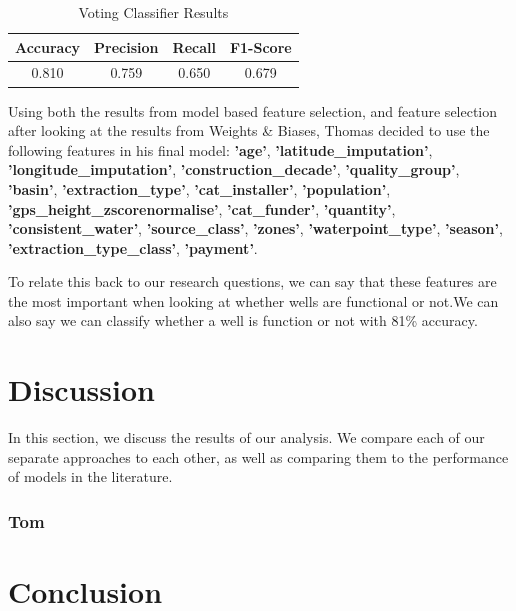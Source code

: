 \documentclass[conference]{IEEEtran}
\begin{document}
\begin{table}[H]
  \centering
  \caption{Voting Classifier Results}
  \label{tab:voting_classification_results}
  \begin{tabular}{|c|c|c|c|}
    \hline
    Accuracy & Precision & Recall & F1-Score \\
    \hline
    0.810 & 0.759 & 0.650 & 0.679 \\
    \hline
  \end{tabular}
\end{table}

Using both the results from model based feature selection, and feature selection after looking at the results from Weights \& Biases, Thomas decided to use the following features in his final model: \textbf{'age'}, \textbf{'latitude\_imputation'}, \textbf{'longitude\_imputation'}, \textbf{'construction\_decade'}, \textbf{'quality\_group'}, \textbf{'basin'}, \textbf{'extraction\_type'}, \textbf{'cat\_installer'}, \textbf{'population'}, \textbf{'gps\_height\_zscorenormalise'}, \textbf{'cat\_funder'}, \textbf{'quantity'}, \textbf{'consistent\_water'}, \textbf{'source\_class'}, \textbf{'zones'}, \textbf{'waterpoint\_type'}, \textbf{'season'}, \textbf{'extraction\_type\_class'}, \textbf{'payment'}.

To relate this back to our research questions, we can say that these features are the most important when looking at whether wells are functional or not.We can also say we can classify whether a well is function or not with 81\% accuracy.


\section{Discussion}

In this section, we discuss the results of our analysis. We compare each of our separate approaches to each other, as well as comparing them to the performance of models in the literature.

\subsubsection{Tom}

\section{Conclusion}



\end{document}
